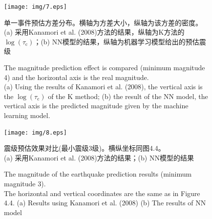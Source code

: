 \begin{figure}[!h] 
\centering 
 \texttt{[image: img/7.eps]} 
 \renewcommand{\figurename}{图} 
\caption{单一事件预估方差分布。横轴为方差大小，纵轴为该方差的密度。\\
(a) 采用Kanamori et al. (2008)方法的结果，纵轴为K方法的$\log \left(\tau_{\mathrm{c}}\right)$；(b) NN模型的结果，纵轴为机器学习模型给出的预估震级} 
\addtocounter{figure}{-1} \vspace{-5pt} 
\renewcommand{\figurename}{Fig} 
\caption{The magnitude prediction effect is compared (minimum magnitude 4) and the horizontal axis is the real magnitude.\\
(a) Using the results of Kanamori et al. (2008), the vertical axis is the $\log \left(\tau_{\mathrm{c}}\right)$ of the K method; (b) the result of the NN model, the vertical axis is the predicted magnitude given by the machine learning model.} 
\renewcommand{\figurename}{图} 
\label{fig:network-device-influence.png} 
\end{figure}


\begin{figure}[!h] 
\centering 
 \texttt{[image: img/8.eps]} 
 \renewcommand{\figurename}{图} 
\caption{ 震级预估效果对比(最小震级3级)。横纵坐标同图4.4。\\
(a) 采用Kanamori et al. (2008)方法的结果；(b) NN模型的结果} 
\addtocounter{figure}{-1} \vspace{-5pt} 
\renewcommand{\figurename}{Fig} 
\caption{The magnitude of the earthquake prediction results (minimum magnitude 3). \\
The horizontal and vertical coordinates are the same as in Figure 4.4.
(a) Results using Kanamori et al. (2008) (b) The results of NN model
} 
\renewcommand{\figurename}{图} 
\label{fig:network-device-influence.png} 
\end{figure}


